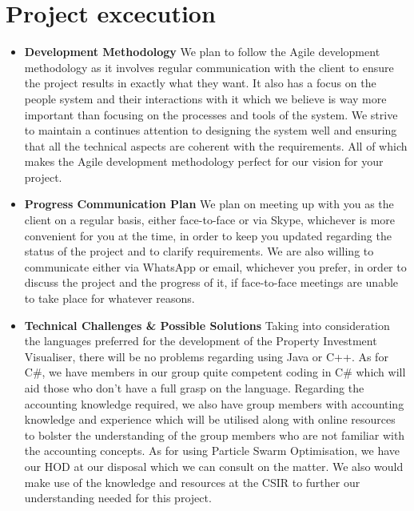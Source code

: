 \documentclass{article}
\begin{document}
	\section{Project excecution}
	\begin{itemize}
		\item \textbf{Development Methodology} \newline \newline
		We plan to follow the Agile development methodology as it involves regular communication with the client to ensure the project results in exactly what they want. It also has a focus on the people system and their interactions with it which we believe is way more important than focusing on the processes and tools of the system. We strive to maintain a continues attention to designing the system well and ensuring that all the technical aspects are coherent with the requirements. All of which makes the Agile development methodology perfect for our vision for your project.
		
		\item \textbf{Progress Communication Plan} \newline \newline
		We plan on meeting up with you as the client on a regular basis, either face-to-face or via Skype, whichever is more convenient for you at the time, in order to keep you updated regarding the status of the project and to clarify requirements. We are also willing to communicate either via WhatsApp or email, whichever you prefer, in order to discuss the project and the progress of it, if face-to-face meetings are unable to take place for whatever reasons.

		\item \textbf{Technical Challenges \& Possible Solutions} \newline \newline
		Taking into consideration the languages preferred for the development of the Property Investment Visualiser, there will be no problems regarding using Java or C++. As for C#, we have members in our group quite competent coding in C# which will aid those who don't have a full grasp on the language. Regarding the accounting knowledge required, we also have group members with accounting knowledge and experience which will be utilised along with online resources to bolster the understanding of the group members who are not familiar with the accounting concepts. \newline
		As for using Particle Swarm Optimisation, we have our HOD at our disposal which we can consult on the matter. We also would make use of the knowledge and resources at the CSIR to further our understanding needed for this project.


\end{itemize}
\end{document}
